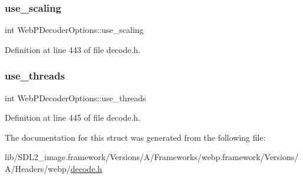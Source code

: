 \subsubsection{\texorpdfstring{use\_scaling}{use\_scaling}}
{\footnotesize\ttfamily int Web\+P\+Decoder\+Options\+::use\+\_\+scaling}



Definition at line 443 of file decode.\+h.

\mbox{\label{struct_web_p_decoder_options_ae1c9cbad64a9a92823d1bc1d03318a52}} 
\subsubsection{\texorpdfstring{use\_threads}{use\_threads}}
{\footnotesize\ttfamily int Web\+P\+Decoder\+Options\+::use\+\_\+threads}



Definition at line 445 of file decode.\+h.



The documentation for this struct was generated from the following file\+:\begin{DoxyCompactItemize}
\item 
lib/\+S\+D\+L2\+\_\+image.\+framework/\+Versions/\+A/\+Frameworks/webp.\+framework/\+Versions/\+A/\+Headers/webp/\mbox{\hyperlink{decode_8h}{decode.\+h}}\end{DoxyCompactItemize}
